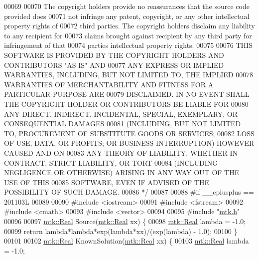 \begin{DoxyCode}
00069 \textcolor{comment}{}
00070 \textcolor{comment}{The copyright holders provide no reassurances that the source code provided does}
00071 \textcolor{comment}{not infringe any patent, copyright, or any other intellectual property rights of}
00072 \textcolor{comment}{third parties. The copyright holders disclaim any liability to any recipient for}
00073 \textcolor{comment}{claims brought against recipient by any third party for infringement of that}
00074 \textcolor{comment}{parties intellectual property rights.}
00075 \textcolor{comment}{}
00076 \textcolor{comment}{THIS SOFTWARE IS PROVIDED BY THE COPYRIGHT HOLDERS AND CONTRIBUTORS "AS IS" AND}
00077 \textcolor{comment}{ANY EXPRESS OR IMPLIED WARRANTIES, INCLUDING, BUT NOT LIMITED TO, THE IMPLIED}
00078 \textcolor{comment}{WARRANTIES OF MERCHANTABILITY AND FITNESS FOR A PARTICULAR PURPOSE ARE}
00079 \textcolor{comment}{DISCLAIMED. IN NO EVENT SHALL THE COPYRIGHT HOLDER OR CONTRIBUTORS BE LIABLE FOR}
00080 \textcolor{comment}{ANY DIRECT, INDIRECT, INCIDENTAL, SPECIAL, EXEMPLARY, OR CONSEQUENTIAL DAMAGES}
00081 \textcolor{comment}{(INCLUDING, BUT NOT LIMITED TO, PROCUREMENT OF SUBSTITUTE GOODS OR SERVICES;}
00082 \textcolor{comment}{LOSS OF USE, DATA, OR PROFITS; OR BUSINESS INTERRUPTION) HOWEVER CAUSED AND ON}
00083 \textcolor{comment}{ANY THEORY OF LIABILITY, WHETHER IN CONTRACT, STRICT LIABILITY, OR TORT}
00084 \textcolor{comment}{(INCLUDING NEGLIGENCE OR OTHERWISE) ARISING IN ANY WAY OUT OF THE USE OF THIS}
00085 \textcolor{comment}{SOFTWARE, EVEN IF ADVISED OF THE POSSIBILITY OF SUCH DAMAGE.}
00086 \textcolor{comment}{*/}
00087 
00088 \textcolor{preprocessor}{#if \_\_cplusplus == 201103L}
00089 
00090 \textcolor{preprocessor}{#include <iostream>}
00091 \textcolor{preprocessor}{#include <fstream>}
00092 \textcolor{preprocessor}{#include <cmath>}
00093 \textcolor{preprocessor}{#include <vector>}
00094 
00095 \textcolor{preprocessor}{#include "\hyperlink{mtk_8h}{mtk.h}"}
00096 
00097 \hyperlink{group__c01-roots_gac080bbbf5cbb5502c9f00405f894857d}{mtk::Real} Source(\hyperlink{group__c01-roots_gac080bbbf5cbb5502c9f00405f894857d}{mtk::Real} xx) \{
00098   \hyperlink{group__c01-roots_gac080bbbf5cbb5502c9f00405f894857d}{mtk::Real} lambda = -1.0;
00099   \textcolor{keywordflow}{return} lambda*lambda*exp(lambda*xx)/(exp(lambda) - 1.0);
00100 \}
00101 
00102 \hyperlink{group__c01-roots_gac080bbbf5cbb5502c9f00405f894857d}{mtk::Real} KnownSolution(\hyperlink{group__c01-roots_gac080bbbf5cbb5502c9f00405f894857d}{mtk::Real} xx) \{
00103   \hyperlink{group__c01-roots_gac080bbbf5cbb5502c9f00405f894857d}{mtk::Real} lambda = -1.0;

\end{DoxyCode}
